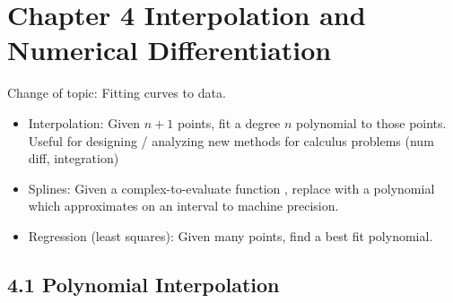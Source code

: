 \documentclass{article}
\theoremstyle{remark}
\begin{document}
\section{Chapter 4 Interpolation and Numerical Differentiation} 

Change of topic: Fitting curves to data.
\begin{itemize}
\item Interpolation: Given $n+1$ points, fit a degree $n$ polynomial to those points. Useful for designing / analyzing new methods for calculus problems (num diff, integration)
\item Splines: Given a complex-to-evaluate function , replace with a polynomial which approximates on an interval to machine precision.
\item Regression (least squares): Given many points, find a best fit polynomial. 
\end{itemize}

\subsection{4.1 Polynomial Interpolation }
\end{document}
